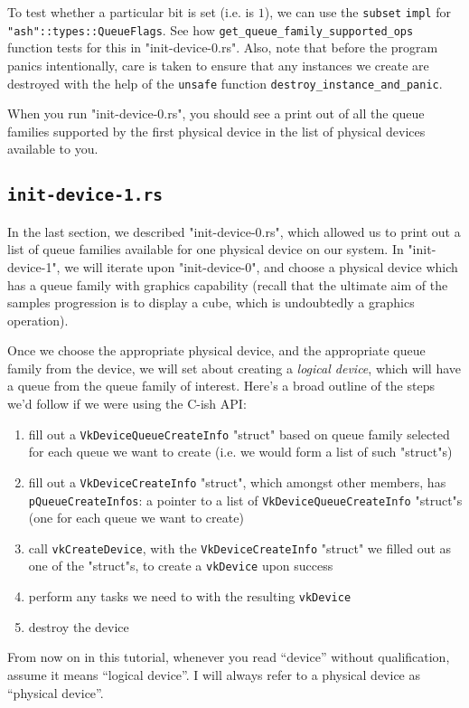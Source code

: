 \documentclass[12pt,letterpaper]{article}
\newcommand{\inquotes}[1]{``#1''}	%
\newcommand{\ril}[1]{\texttt{#1}}
\newcommand{\cil}[1]{\texttt{#1}}
\begin{document}
		To test whether a particular bit is set (i.e. is $1$), we can use the \ril{subset} \ril{impl} for \ril{"ash"::types::QueueFlags}. See how \ril{get_queue_family_supported_ops} function tests for this in "init-device-0.rs". Also, note that before the program panics intentionally, care is taken to ensure that any instances we create are destroyed with the help of the \ril{unsafe} function \ril{destroy_instance_and_panic}.
				
		When you run "init-device-0.rs", you should see a print out of all the queue families supported by the first physical device in the list of physical devices available to you. 
		
	\subsection{\texttt{init-device-1.rs}}
		In the last section, we described "init-device-0.rs", which allowed us to print out a list of queue families available for one physical device on our system. In "init-device-1", we will iterate upon "init-device-0", and choose a physical device which has a queue family with graphics capability (recall that the ultimate aim of the samples progression is to display a cube, which is undoubtedly a graphics operation).
		
		Once we choose the appropriate physical device, and the appropriate queue family from the device, we will set about creating a \emph{logical device}, which will have a queue from the queue family of interest. Here's a broad outline of the steps we'd follow if we were using the C-ish API:
			\begin{enumerate}
				\item fill out a \cil{VkDeviceQueueCreateInfo} "struct" based on queue family selected for each queue we want to create (i.e. we would form a list of such "struct"s)
				
				\item fill out a \cil{VkDeviceCreateInfo} "struct", which amongst other members, has \cil{pQueueCreateInfos}: a pointer to a list of \cil{VkDeviceQueueCreateInfo} "struct"s (one for each queue we want to create)
				
				\item call \cil{vkCreateDevice}, with the \cil{VkDeviceCreateInfo} "struct" we filled out as one of the "struct"s, to create a \cil{vkDevice} upon success
				
				\item perform any tasks we need to with the resulting \cil{vkDevice}
				
				\item destroy the device
			\end{enumerate}
		From now on in this tutorial, whenever you read \inquotes{device} without qualification, assume it means \inquotes{logical device}. I will always refer to a physical device as \inquotes{physical device}.
		
\end{document}
